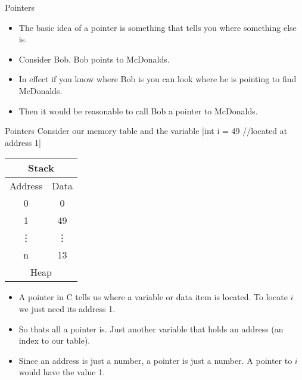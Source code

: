 \documentclass[10pt]{beamer}
\begin{document}
\begin{frame}[fragile]{Pointers}
	\begin{itemize}[<+->]
		\item The basic idea of a pointer is something that tells you where something else is.
		\item Consider Bob. Bob points to McDonalds. 
		\item In effect if you know where Bob is you can look where he is pointing to find McDonalds. \item Then it would be reasonable to call Bob a pointer to McDonalds.
	\end{itemize}
\end{frame}

\begin{frame}[fragile]{Pointers}
	Consider our memory table and the variable
	|int i = 49 //located at address 1|

	\begin{tabular}{|c|c|}
		\hline
		\multicolumn{2}{|c|}{Stack}\\
		\hline
		Address & Data\\
		\hline
		0 &	0\\
		\hline
		1 &	49\\
		\hline
		\vdots & \vdots \\
		\hline
		n & 13\\
		\hline
		\multicolumn{2}{|c|}{Heap}\\
		\hline
	\end{tabular}


	\begin{itemize}[<+->]
		\item A pointer in C tells us where a variable or data item is located. To locate $i$ we just need its address 1.
		\item So thats all a pointer is. Just another variable that holds an address (an index to our table).
		\item Since an address is just a number, a pointer is just a number. A pointer to $i$ would have the value 1.
	\end{itemize}
\end{frame}
\end{document}

